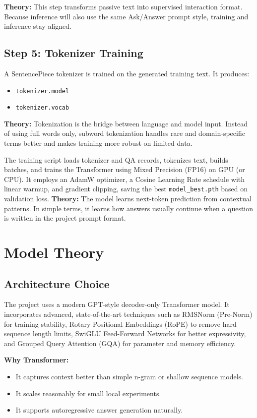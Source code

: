 \documentclass[a4paper,11pt]{article}
\begin{document}
\textbf{Theory:}
This step transforms passive text into supervised interaction format.
Because inference will also use the same Ask/Answer prompt style, training and inference stay aligned.

\subsection{Step 5: Tokenizer Training}
A SentencePiece tokenizer is trained on the generated training text.
It produces:
\begin{itemize}[leftmargin=1.5em]
    \item \texttt{tokenizer.model}
    \item \texttt{tokenizer.vocab}
\end{itemize}

\textbf{Theory:}
Tokenization is the bridge between language and model input.
Instead of using full words only, subword tokenization handles rare and domain-specific terms better and makes training more robust on limited data.

The training script loads tokenizer and QA records, tokenizes text, builds batches, and trains the Transformer using Mixed Precision (FP16) on GPU (or CPU). It employs an AdamW optimizer, a Cosine Learning Rate schedule with linear warmup, and gradient clipping, saving the best \texttt{model\_best.pth} based on validation loss.
\textbf{Theory:}
The model learns next-token prediction from contextual patterns.
In simple terms, it learns how answers usually continue when a question is written in the project prompt format.

\section{Model Theory}
\subsection{Architecture Choice}
The project uses a modern GPT-style decoder-only Transformer model. It incorporates advanced, state-of-the-art techniques such as RMSNorm (Pre-Norm) for training stability, Rotary Positional Embeddings (RoPE) to remove hard sequence length limits, SwiGLU Feed-Forward Networks for better expressivity, and Grouped Query Attention (GQA) for parameter and memory efficiency.

\textbf{Why Transformer:}
\begin{itemize}[leftmargin=1.5em]
    \item It captures context better than simple n-gram or shallow sequence models.
    \item It scales reasonably for small local experiments.
    \item It supports autoregressive answer generation naturally.
\end{itemize}
\end{document}
